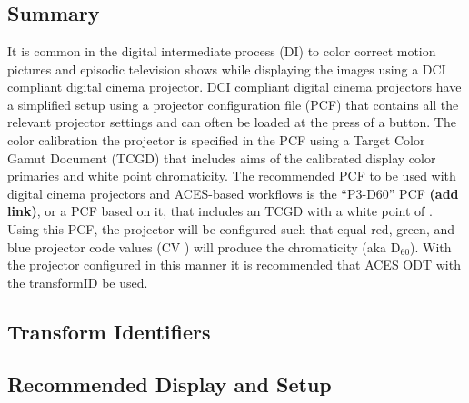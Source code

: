 \section[P3-D60]{\shortName{\id}}
\label{sec:odt-details-\id}

\subsection{Summary}
\label{subsec:summary-\id}

It is common in the digital intermediate process (DI) to color correct motion pictures and episodic television shows while displaying the images using a DCI compliant digital cinema projector. DCI compliant digital cinema projectors have a simplified setup using a projector configuration file (PCF) that contains all the relevant projector settings and can often be loaded at the press of a button. The color calibration the projector is specified in the PCF using a Target Color Gamut Document (TCGD) that includes aims of the calibrated display color primaries and white point chromaticity. The recommended PCF to be used with digital cinema projectors and ACES-based workflows is the ``P3-D60'' PCF \textbf{(add link)}, or a PCF based on it, that includes an TCGD with a white point of . Using this PCF, the projector will be configured such that equal red, green, and blue projector code values (CV \rgbequal{}) will produce the chromaticity  (aka D$_{60}$). With the projector configured in this manner it is recommended that ACES ODT with the transformID \transformID{\id} be used.

\subsection{Transform Identifiers} 
\label{subsec:odt-ident-\id}

\subsection{Recommended Display and Setup}
\label{subsec:setup-\id}

